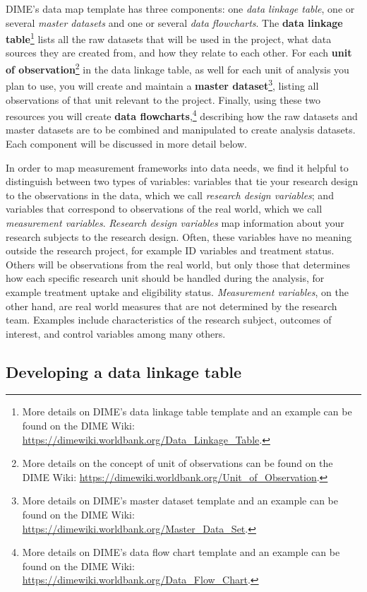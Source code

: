 \documentclass[
]{book}
\begin{document}
DIME's data map template has three components:
one \emph{data linkage table},
one or several \emph{master datasets}
and one or several \emph{data flowcharts}.
The \textbf{data linkage table}\footnote{More details on DIME's data linkage table template
  and an example can be found on the DIME Wiki:
  \url{https://dimewiki.worldbank.org/Data_Linkage_Table}.}
lists all the raw datasets that will be used in the project,
what data sources they are created from,
and how they relate to each other.
For each \textbf{unit of observation}\footnote{More details on the concept of unit of observations
  can be found on the DIME Wiki:
  \url{https://dimewiki.worldbank.org/Unit_of_Observation}.}
in the data linkage table,
as well for each unit of analysis you plan to use,
you will create and maintain a \textbf{master dataset}\footnote{More details on DIME's master dataset template
  and an example can be found on the DIME Wiki:
  \url{https://dimewiki.worldbank.org/Master_Data_Set}.},
listing all observations of that unit relevant to the project.
Finally, using these two resources
you will create \textbf{data flowcharts},\footnote{More details on DIME's data flow chart template
  and an example can be found on the DIME Wiki:
  \url{https://dimewiki.worldbank.org/Data_Flow_Chart}.}
describing how the raw datasets and master datasets
are to be combined and manipulated to create analysis datasets.
Each component will be discussed in more detail below.

In order to map measurement frameworks into data needs,
we find it helpful to distinguish between two types of variables:
variables that tie your research design
to the observations in the data,
which we call \emph{research design variables};
and variables that correspond to observations of the real world,
which we call \emph{measurement variables}.
\emph{Research design variables} map information
about your research subjects to the research design.
Often, these variables have no meaning outside the research project,
for example ID variables and treatment status.
Others will be observations from the real world,
but only those that determines how each specific research unit
should be handled during the analysis,
for example treatment uptake and eligibility status.
\emph{Measurement variables}, on the other hand,
are real world measures that are not determined by the research team.
Examples include characteristics of the research subject,
outcomes of interest, and control variables among many others.

\hypertarget{developing-a-data-linkage-table}{%
\subsection*{Developing a data linkage table}\label{developing-a-data-linkage-table}}
\end{document}
